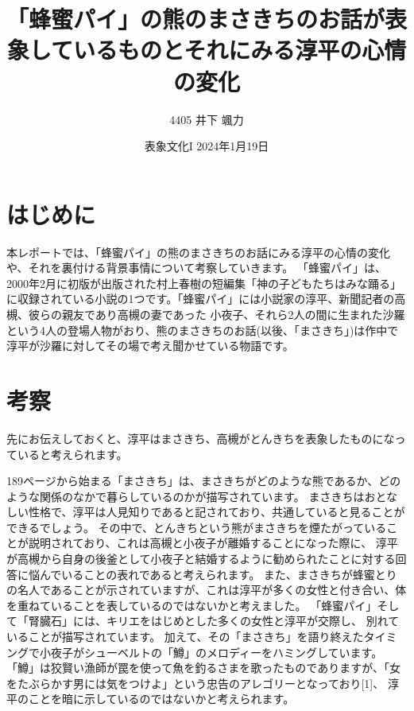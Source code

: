 \documentclass[12pt,a4paper]{jsarticle}
\title{「蜂蜜パイ」の熊のまさきちのお話が表象しているものとそれにみる淳平の心情の変化}
\author{4405 井下 颯力}
\date{表象文化I 2024年1月19日}
\numberwithin{equation}{section}
\numberwithin{figure}{section}
\numberwithin{table}{section}
\begin{document}
\maketitle

\section{はじめに}
本レポートでは、「蜂蜜パイ」の熊のまさきちのお話にみる淳平の心情の変化や、それを裏付ける背景事情について考察していきます。
「蜂蜜パイ」は、2000年2月に初版が出版された村上春樹の短編集「神の子どもたちはみな踊る」
に収録されている小説の1つです。「蜂蜜パイ」には小説家の淳平、新聞記者の高槻、彼らの親友であり高槻の妻であった
小夜子、それら2人の間に生まれた沙羅という4人の登場人物がおり、熊のまさきちのお話(以後、「まさきち」)は作中で淳平が沙羅に対してその場で考え聞かせている物語です。

\section{考察}
先にお伝えしておくと、淳平はまさきち、高槻がとんきちを表象したものになっていると考えられます。

189ページから始まる「まさきち」は、まさきちがどのような熊であるか、どのような関係のなかで暮らしているのかが描写されています。
まさきちはおとなしい性格で、淳平は人見知りであると記されており、共通していると見ることができるでしょう。
その中で、とんきちという熊がまさきちを煙たがっていることが説明されており、これは高槻と小夜子が離婚することになった際に、
淳平が高槻から自身の後釜として小夜子と結婚するように勧められたことに対する回答に悩んでいることの表れであると考えられます。
また、まさきちが蜂蜜とりの名人であることが示されていますが、これは淳平が多くの女性と付き合い、体を重ねていることを表しているのではないかと考えました。
「蜂蜜パイ」そして「腎臓石」には、キリエをはじめとした多くの女性と淳平が交際し、
別れていることが描写されています。
加えて、その「まさきち」を語り終えたタイミングで小夜子がシューベルトの「鱒」のメロディーをハミングしています。
「鱒」は狡賢い漁師が罠を使って魚を釣るさまを歌ったものでありますが、「女をたぶらかす男には気をつけよ」という忠告のアレゴリーとなっており[1]、
淳平のことを暗に示しているのではないかと考えられます。
\end{document}
